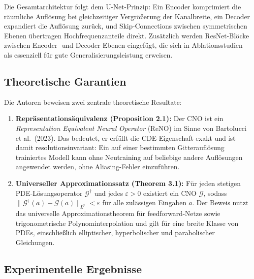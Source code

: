 \documentclass[a4paper,12pt]{article}
\begin{document}
Die Gesamtarchitektur folgt dem U-Net-Prinzip: Ein Encoder komprimiert die
r\"aumliche Aufl\"osung bei gleichzeitiger Vergr\"o\ss erung der Kanalbreite,
ein Decoder expandiert die Aufl\"osung zur\"uck, und Skip-Connections
zwischen symmetrischen Ebenen \"ubertragen Hochfrequenzanteile direkt. Zus\"atzlich
werden ResNet-Bl\"ocke zwischen Encoder- und Decoder-Ebenen eingef\"ugt, die sich
in Ablationsstudien als essenziell f\"ur gute Generalisierungsleistung erweisen.

\subsection*{Theoretische Garantien}

Die Autoren beweisen zwei zentrale theoretische Resultate:

\begin{enumerate}
  \item \textbf{Repr\"asentations\"aquivalenz (Proposition 2.1):} Der CNO ist
    ein \emph{Representation Equivalent Neural Operator} (ReNO) im Sinne von
    Bartolucci et al.\ (2023). Das bedeutet, er erf\"ullt die
    CDE-Eigenschaft exakt und ist damit resolutionsinvariant: Ein auf einer
    bestimmten Gitteraufl\"osung trainiertes Modell kann ohne Neutraining auf
    beliebige andere Aufl\"osungen angewendet werden, ohne Aliasing-Fehler
    einzuf\"uhren.

  \item \textbf{Universeller Approximationssatz (Theorem 3.1):} F\"ur jeden
    stetigen PDE-L\"osungsoperator $\mathcal{G}^\dagger$ und jedes
    $\varepsilon > 0$ existiert ein CNO $\mathcal{G}$, sodass
    $\|\mathcal{G}^\dagger(a) - \mathcal{G}(a)\|_{L^p} < \varepsilon$ f\"ur
    alle zul\"assigen Eingaben $a$. Der Beweis nutzt das universelle
    Approximationstheorem f\"ur feedforward-Netze sowie trigonometrische
    Polynominterpolation und gilt f\"ur eine breite Klasse von PDEs,
    einschlie\ss lich elliptischer, hyperbolischer und parabolischer Gleichungen.
\end{enumerate}

\subsection*{Experimentelle Ergebnisse}
\end{document}
